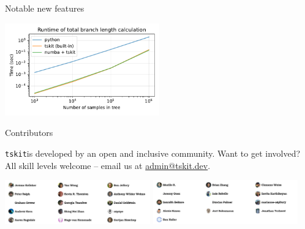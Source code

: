 \documentclass[landscape,a0paper,fontscale=0.4]{baposter}
\newcommand{\tskit}{{\texttt{tskit}}}
\begin{document}
\begin{poster}
\begin{posterbox}[name=operations,column=3,above=bottom,span=1]{Notable new features}
\begin{multicols}{2}
\includegraphics[width=0.5\textwidth]{numba_runtime}
\end{multicols}

\end{posterbox}



\begin{posterbox}[name=refs,column=1,span=2,above=bottom]{Contributors}

\tskit is developed by an open and inclusive community.
Want to get involved?
All skill levels welcome -- email us at \url{admin@tskit.dev}.

\begin{center}
\includegraphics[width=0.47\textwidth]{tskit-contributors1}
\includegraphics[width=0.47\textwidth]{tskit-contributors2}
\end{center}


\end{posterbox}


\end{poster}%
\end{document}
